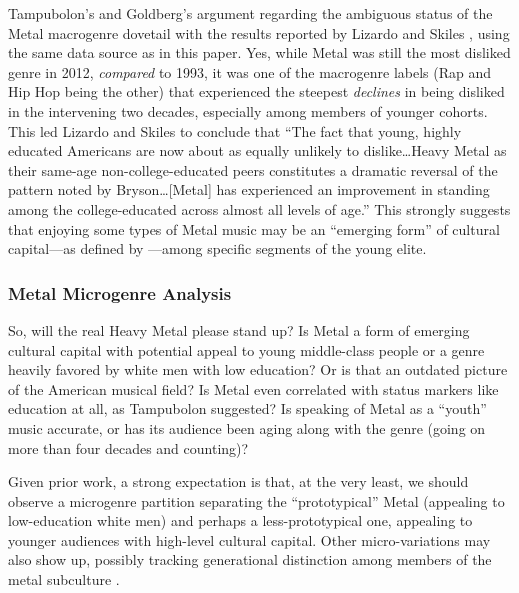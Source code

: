 \documentclass[a4paper,12pt]{article}
\begin{document}
Tampubolon's and Goldberg's argument regarding the ambiguous status of the Metal macrogenre dovetail with the results reported by Lizardo and Skiles \citeyearpar{lizardo_skiles15}, using the same data source as in this paper. Yes, while Metal was still the most disliked genre in 2012, \textit{compared} to 1993, it was one of the macrogenre labels (Rap and Hip Hop being the other) that experienced the steepest \textit{declines} in being disliked in the intervening two decades, especially among members of younger cohorts. This led Lizardo and Skiles \citeyearpar[][18]{lizardo_skiles15} to conclude that ``The fact that young, highly educated Americans are now about as equally unlikely to dislike\ldots Heavy Metal as their same-age non-college-educated peers constitutes a dramatic reversal of the pattern noted by Bryson\ldots [Metal] has experienced an improvement in standing among the college-educated across almost all levels of age.'' This strongly suggests that enjoying some types of Metal music may be an ``emerging form'' of cultural capital---as defined by \citet{prieur2013emerging}---among specific segments of the young elite.  

\subsubsection{Metal Microgenre Analysis}
So, will the real Heavy Metal please stand up? Is Metal a form of emerging cultural capital with potential appeal to young middle-class people or a genre heavily favored by white men with low education? Or is that an outdated picture of the American musical field? Is Metal even correlated with status markers like education at all, as Tampubolon suggested? Is speaking of Metal as a ``youth'' music accurate, or has its audience been aging along with the genre (going on more than four decades and counting)? 

Given prior work, a strong expectation is that, at the very least, we should observe a microgenre partition separating the ``prototypical'' Metal (appealing to low-education white men) and perhaps a less-prototypical one, appealing to younger audiences with high-level cultural capital. Other micro-variations may also show up, possibly tracking generational distinction among members of the metal subculture \citep{koch2020evolutionary}.
\end{document}
